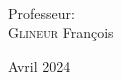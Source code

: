 \begin{titlepage}
\begin{center}
\\ [2 cm]
\Large
Professeur:\\
\textsc{Glineur} François\\

		
		\vfill
		
		\vfill
		
		{\large Avril 2024}
		
		\newpage

		\setcounter{tocdepth}{3}
		\vfill
	\end{center}
\end{titlepage}
\clearpage
{}